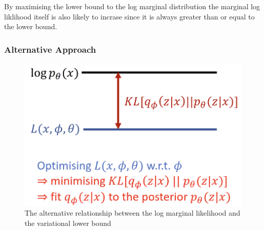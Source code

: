\documentclass[11pt]{article}
\begin{document}
By maximising the lower bound to the log marginal distribution the marginal log liklihood itself is also likely to incrase since it is always greater than or equal to the lower bound.

\subsubsection{Alternative Approach}

\begin{figure}[H]
    \centering
\end{figure}

\begin{figure}[H]
    \centering
    \includegraphics[width=.6\linewidth]{figures/variational-a-e-alt.png}
    \caption{The alternative relationship between the log marginal likelihood and the variational lower bound}
\end{figure}
\end{document}
